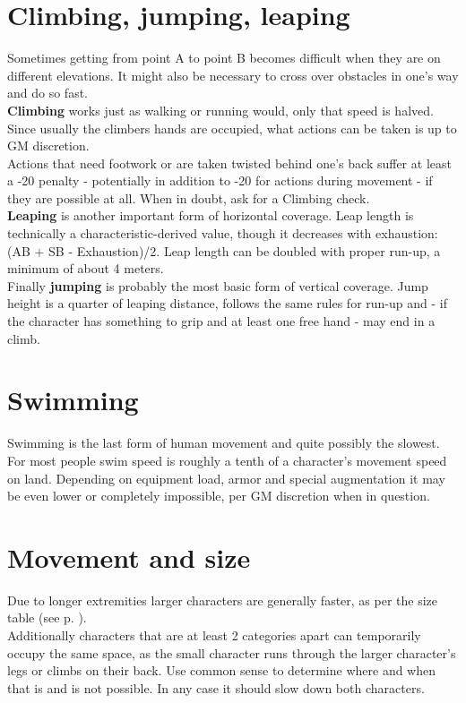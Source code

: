 \documentclass[12pt,a4paper,openany,usenames,dvipsnames]{book}
\begin{document}
	\section{Climbing, jumping, leaping}
	Sometimes getting from point A to point B becomes difficult when they are on different elevations. It might also be necessary to cross over obstacles in one’s way and do so fast.\\
	\textbf{Climbing} works just as walking or running would, only that speed is halved. Since usually the climbers hands are occupied, what actions can be taken is up to GM discretion.\\
	Actions that need footwork or are taken twisted behind one’s back suffer at least a -20 penalty - potentially in addition to -20 for actions during movement - if they are possible at all. When in doubt, ask for a Climbing check.\\
	\textbf{Leaping} is another important form of horizontal coverage. Leap length is technically a characteristic-derived value, though it decreases with exhaustion: (AB + SB - Exhaustion)/2. Leap length can be doubled with proper run-up, a minimum of about 4 meters.\\
	Finally \textbf{jumping} is probably the most basic form of vertical coverage. Jump height is a quarter of leaping distance, follows the same rules for run-up and - if the character has something to grip and at least one free hand - may end in a climb.
	\section{Swimming}
	Swimming is the last form of human movement and quite possibly the slowest. For most people swim speed is roughly a tenth of a character’s movement speed on land. Depending on equipment load, armor and special augmentation it may be even lower or completely impossible, per GM discretion when in question.
	\section{Movement and size}
	Due to longer extremities larger characters are generally faster, as per the size table (see p. \pageref{sizestable}).\\
	Additionally characters that are at least 2 categories apart can temporarily occupy the same space, as the small character runs through the larger character’s legs or climbs on their back. Use common sense to determine where and when that is and is not possible. In any case it should slow down both characters.
\end{document}
